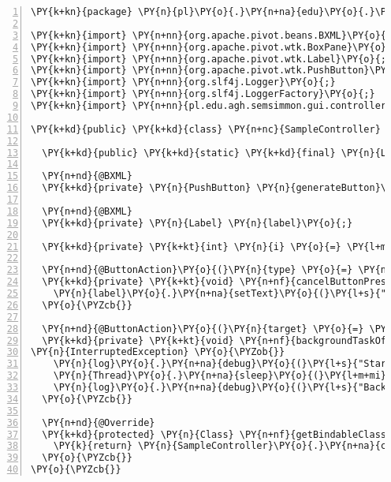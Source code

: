 \begin{Verbatim}[commandchars=\\\{\},numbers=left,firstnumber=1,stepnumber=1]
\PY{k+kn}{package} \PY{n}{pl}\PY{o}{.}\PY{n+na}{edu}\PY{o}{.}\PY{n+na}{agh}\PY{o}{.}\PY{n+na}{semsimmon}\PY{o}{.}\PY{n+na}{gui}\PY{o}{.}\PY{n+na}{controllers}\PY{o}{;}

\PY{k+kn}{import} \PY{n+nn}{org.apache.pivot.beans.BXML}\PY{o}{;}
\PY{k+kn}{import} \PY{n+nn}{org.apache.pivot.wtk.BoxPane}\PY{o}{;}
\PY{k+kn}{import} \PY{n+nn}{org.apache.pivot.wtk.Label}\PY{o}{;}
\PY{k+kn}{import} \PY{n+nn}{org.apache.pivot.wtk.PushButton}\PY{o}{;}
\PY{k+kn}{import} \PY{n+nn}{org.slf4j.Logger}\PY{o}{;}
\PY{k+kn}{import} \PY{n+nn}{org.slf4j.LoggerFactory}\PY{o}{;}
\PY{k+kn}{import} \PY{n+nn}{pl.edu.agh.semsimmon.gui.controllers.action.ButtonAction}\PY{o}{;}

\PY{k+kd}{public} \PY{k+kd}{class} \PY{n+nc}{SampleController} \PY{k+kd}{extends} \PY{n+nc}{BaseController}\PY{o}{<}\PY{n+nc}{BoxPane}\PY{o}{>} \PY{o}{\PYZob{}}

  \PY{k+kd}{public} \PY{k+kd}{static} \PY{k+kd}{final} \PY{n}{Logger} \PY{n}{log} \PY{o}{=} \PY{n}{LoggerFactory}\PY{o}{.}\PY{n+na}{getLogger}\PY{o}{(}\PY{n}{SampleController}\PY{o}{.}\PY{n+na}{class}\PY{o}{)}\PY{o}{;}

  \PY{n+nd}{@BXML}
  \PY{k+kd}{private} \PY{n}{PushButton} \PY{n}{generateButton}\PY{o}{;}

  \PY{n+nd}{@BXML}
  \PY{k+kd}{private} \PY{n}{Label} \PY{n}{label}\PY{o}{;}

  \PY{k+kd}{private} \PY{k+kt}{int} \PY{n}{i} \PY{o}{=} \PY{l+m+mi}{0}\PY{o}{;}

  \PY{n+nd}{@ButtonAction}\PY{o}{(}\PY{n}{type} \PY{o}{=} \PY{n}{ButtonAction}\PY{o}{.}\PY{n+na}{Type}\PY{o}{.}\PY{n+na}{INSTANT}\PY{o}{)}
  \PY{k+kd}{private} \PY{k+kt}{void} \PY{n+nf}{cancelButtonPressed}\PY{o}{(}\PY{o}{)} \PY{o}{\PYZob{}}
    \PY{n}{label}\PY{o}{.}\PY{n+na}{setText}\PY{o}{(}\PY{l+s}{"Sample content "} \PY{o}{+} \PY{n}{i}\PY{o}{+}\PY{o}{+}\PY{o}{)}\PY{o}{;}
  \PY{o}{\PYZcb{}}

  \PY{n+nd}{@ButtonAction}\PY{o}{(}\PY{n}{target} \PY{o}{=} \PY{l+s}{"cancelButton"}\PY{o}{,} \PY{n}{type} \PY{o}{=} \PY{n}{ButtonAction}\PY{o}{.}\PY{n+na}{Type}\PY{o}{.}\PY{n+na}{BACKGROUND}\PY{o}{)}
  \PY{k+kd}{private} \PY{k+kt}{void} \PY{n+nf}{backgroundTaskOfGenerateButton}\PY{o}{(}\PY{o}{)} \PY{k+kd}{throws}
\PY{n}{InterruptedException} \PY{o}{\PYZob{}}
    \PY{n}{log}\PY{o}{.}\PY{n+na}{debug}\PY{o}{(}\PY{l+s}{"Starting background task"}\PY{o}{)}\PY{o}{;}
    \PY{n}{Thread}\PY{o}{.}\PY{n+na}{sleep}\PY{o}{(}\PY{l+m+mi}{5000}\PY{o}{)}\PY{o}{;}
    \PY{n}{log}\PY{o}{.}\PY{n+na}{debug}\PY{o}{(}\PY{l+s}{"Background task done"}\PY{o}{)}\PY{o}{;}
  \PY{o}{\PYZcb{}}

  \PY{n+nd}{@Override}
  \PY{k+kd}{protected} \PY{n}{Class} \PY{n+nf}{getBindableClass}\PY{o}{(}\PY{o}{)} \PY{o}{\PYZob{}}
    \PY{k}{return} \PY{n}{SampleController}\PY{o}{.}\PY{n+na}{class}\PY{o}{;}
  \PY{o}{\PYZcb{}}
\PY{o}{\PYZcb{}}
\end{Verbatim}
